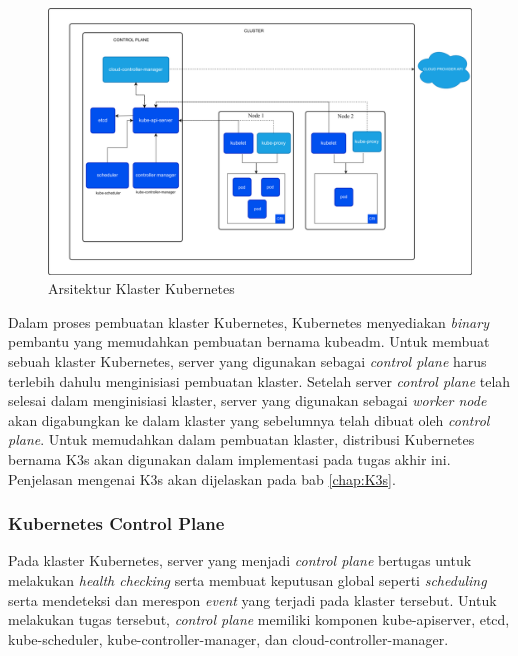 \begin{figure}[H]
  \centering
  \includegraphics[scale=0.15]{gambar/kubernetes-cluster-architecture.png}
  \caption{Arsitektur Klaster Kubernetes}
  \label{fig:arsitektur-cluster-kubernetes}
\end{figure}

Dalam proses pembuatan klaster Kubernetes, Kubernetes menyediakan \emph{binary} pembantu
yang memudahkan pembuatan bernama kubeadm. Untuk membuat sebuah klaster Kubernetes,
server yang digunakan sebagai \emph{control plane} harus terlebih dahulu menginisiasi
pembuatan klaster. Setelah server \emph{control plane} telah selesai dalam menginisiasi klaster,
server yang digunakan sebagai \emph{worker node} akan digabungkan ke dalam klaster yang sebelumnya
telah dibuat oleh \emph{control plane}. Untuk memudahkan dalam pembuatan klaster, distribusi
Kubernetes bernama K3s akan digunakan dalam implementasi pada tugas akhir ini. Penjelasan
mengenai K3s akan dijelaskan pada bab \ref{chap:K3s}.

\subsubsection{Kubernetes Control Plane}

Pada klaster Kubernetes, server yang menjadi \emph{control plane} bertugas
untuk melakukan \emph{health checking} serta membuat keputusan global seperti \emph{scheduling}
serta mendeteksi dan merespon \emph{event} yang terjadi pada klaster tersebut. Untuk melakukan
tugas tersebut, \emph{control plane} memiliki komponen kube-apiserver,
etcd, kube-scheduler, kube-controller-manager, dan cloud-controller-manager.

